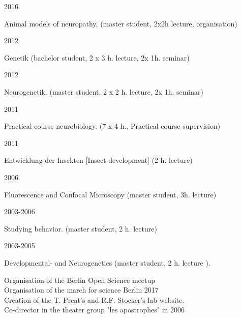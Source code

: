 \parbox{0.15\textwidth}{2016}\hfill
\parbox[t]{0.83\textwidth}{Animal models of neuropathy, (master student, 2x2h lecture, organisation)}
%
\parbox{0.15\textwidth}{2012}\hfill
\parbox[t]{0.83\textwidth}{Genetik (bachelor student, 2 x 3 h. lecture, 2x 1h. seminar)}
\parbox{0.15\textwidth}{2012}\hfill
\parbox[t]{0.83\textwidth}{Neurogenetik. (master student, 2 x 2 h. lecture, 2x 1h. seminar)}
\parbox{0.15\textwidth}{2011}\hfill
\parbox[t]{0.83\textwidth}{Practical course neurobiology. (7 x 4 h., Practical course supervision)}
\parbox{0.15\textwidth}{2011}\hfill
\parbox[t]{0.83\textwidth}{Entwicklung der Insekten [Insect development] (2 h. lecture)}
\parbox{0.15\textwidth}{2006}\hfill
\parbox[t]{0.83\textwidth}{Fluorescence and Confocal Microscopy (master student, 3h. lecture)}
\parbox{0.15\textwidth}{2003-2006}\hfill
\parbox[t]{0.83\textwidth}{Studying behavior. (master student, 2 h. lecture)}
\parbox{0.15\textwidth}{2003-2005}\hfill
\parbox[t]{0.83\textwidth}{Developmental- and Neurogenetics %
(master student, 2 h. lecture%
).}


Organisation of the Berlin Open Science meetup\\
Organisation of the march for science Berlin 2017\\
Creation of the T. Preat's and R.F. Stocker's lab website.
\\
Co-director in the theater group "les apostrophes" in
2006


%

